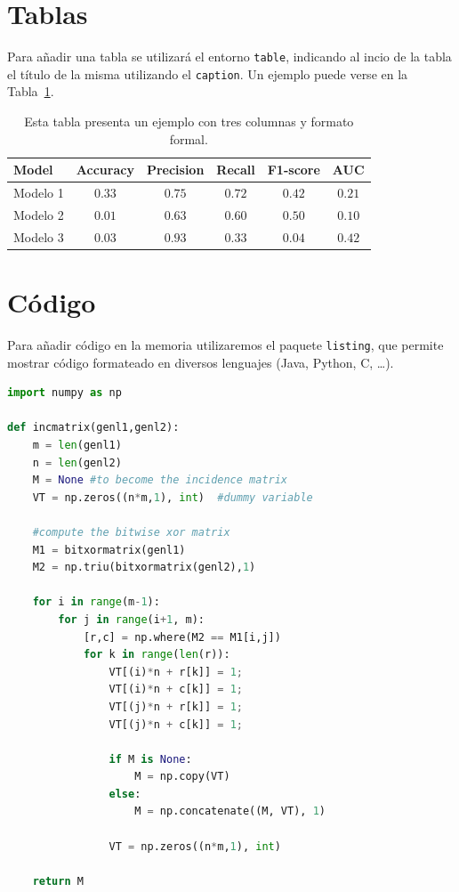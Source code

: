 \section{Tablas}
Para añadir una tabla se utilizará el entorno \verb|table|, indicando al incio de la tabla el título de la misma utilizando el \verb|caption|. Un ejemplo puede verse en la Tabla~\ref{tab:Ejemplo-de-tabla}.

\begin{table}[ht]

\centering
\caption[Ejemplo de tabla]{Esta tabla presenta un ejemplo con tres columnas y formato formal.\label{tab:Ejemplo-de-tabla}}
\begin{tabular}[t]{lccccc}
\hline
Model & Accuracy & Precision & Recall & F1-score & AUC\\ %
\hline
Modelo 1 & $0.33$ & $0.75$ & $0.72$ & $0.42$ & $0.21$ \\
Modelo 2 & $0.01$ & $0.63$ & $0.60$ & $0.50$ & $0.10$ \\
Modelo 3 & $0.03$ & $0.93$ & $0.33$ & $0.04$ & $0.42$ \\
\hline
\end{tabular}
\end{table}



\section{Código}
Para añadir código en la memoria utilizaremos el paquete \verb|listing|, que permite mostrar código formateado en diversos lenguajes (Java, Python, C, \ldots). 

\begin{lstlisting}[language=Python]
import numpy as np
    
def incmatrix(genl1,genl2):
    m = len(genl1)
    n = len(genl2)
    M = None #to become the incidence matrix
    VT = np.zeros((n*m,1), int)  #dummy variable
    
    #compute the bitwise xor matrix
    M1 = bitxormatrix(genl1)
    M2 = np.triu(bitxormatrix(genl2),1) 

    for i in range(m-1):
        for j in range(i+1, m):
            [r,c] = np.where(M2 == M1[i,j])
            for k in range(len(r)):
                VT[(i)*n + r[k]] = 1;
                VT[(i)*n + c[k]] = 1;
                VT[(j)*n + r[k]] = 1;
                VT[(j)*n + c[k]] = 1;
                
                if M is None:
                    M = np.copy(VT)
                else:
                    M = np.concatenate((M, VT), 1)
                
                VT = np.zeros((n*m,1), int)
    
    return M
\end{lstlisting}

